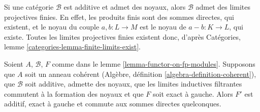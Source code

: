 \noindent
Si une catégorie $\mathcal{B}$ est additive et admet des noyaux,
alors $\mathcal{B}$ admet des limites projectives finies. En effet, les produits finis
sont des sommes directes, qui existent, et le noyau du couple $a, b : L \to M$
est le noyau de $a - b : K \to L$, qui existe. Toutes les limites projectives
finies existent donc, d'après Catégories, lemme \ref{categories-lemma-finite-limits-exist}.

\begin{lemma}
\label{lemma-functor-on-fp-modules-left-exact}
Soient $A$, $\mathcal{B}$, $F$ comme dans le lemme \ref{lemma-functor-on-fp-modules}.
Supposons que $A$ soit un anneau cohérent (Algèbre, définition
\ref{algebra-definition-coherent}), que $\mathcal{B}$ soit additive, admette des noyaux,
que les limites inductives filtrantes commutent à la formation des noyaux et que $F$ soit exact à gauche. Alors
$F'$ est additif, exact à gauche et commute aux sommes directes quelconques.
\end{lemma}

